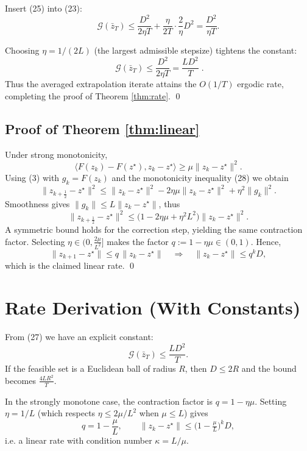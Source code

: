 \documentclass{article}
\begin{document}
Insert (25) into (23):
\[
\mathcal{G}(\bar z_{T})
\le \frac{D^{2}}{2\eta T}+\frac{\eta}{2T}\cdot\frac{2}{\eta}D^{2}
= \frac{D^{2}}{\eta T}. \tag{26}
\]

Choosing $\eta=1/(2L)$ (the largest admissible stepsize) tightens the constant:
\[
\boxed{\;\mathcal{G}(\bar z_{T})\le \frac{D^{2}}{2\eta T}= \frac{L D^{2}}{T}\;}. \tag{27}
\]
Thus the averaged extrapolation iterate attains the $O(1/T)$ ergodic rate, completing the proof of Theorem \ref{thm:rate}. \qed

\subsection*{Proof of Theorem \ref{thm:linear}}
Under strong monotonicity,
\[
\langle F(z_{k})-F(z^{\star}),z_{k}-z^{\star}\rangle\ge \mu\|z_{k}-z^{\star}\|^{2}. \tag{28}
\]
Using (3) with $g_{k}=F(z_{k})$ and the monotonicity inequality (28) we obtain
\[
\|z_{k+\frac12}-z^{\star}\|^{2}
\le \|z_{k}-z^{\star}\|^{2}-2\eta\mu\|z_{k}-z^{\star}\|^{2}+\eta^{2}\|g_{k}\|^{2}. \tag{29}
\]
Smoothness gives $\|g_{k}\|\le L\|z_{k}-z^{\star}\|$, thus
\[
\|z_{k+\frac12}-z^{\star}\|^{2}
\le \bigl(1-2\eta\mu+\eta^{2}L^{2}\bigr)\|z_{k}-z^{\star}\|^{2}. \tag{30}
\]
A symmetric bound holds for the correction step, yielding the same contraction factor. Selecting $\eta\in\bigl(0,\frac{2\mu}{L^{2}}\bigr]$ makes the factor $q:=1-\eta\mu\in(0,1)$. Hence,
\[
\|z_{k+1}-z^{\star}\|\le q\,\|z_{k}-z^{\star}\|\quad\Longrightarrow\quad
\|z_{k}-z^{\star}\|\le q^{k}D,
\]
which is the claimed linear rate. \qed

\section{Rate Derivation (With Constants)}
From (27) we have an explicit constant:
\[
\mathcal{G}(\bar z_{T})\le \frac{L D^{2}}{T}.
\]
If the feasible set is a Euclidean ball of radius $R$, then $D\le 2R$ and the bound becomes $\displaystyle \frac{4LR^{2}}{T}$.

In the strongly monotone case, the contraction factor is $q=1-\eta\mu$. Setting $\eta=1/L$ (which respects $\eta\le 2\mu/L^{2}$ when $\mu\le L$) gives
\[
q=1-\frac{\mu}{L},\qquad
\|z_{k}-z^{\star}\|\le\bigl(1-\tfrac{\mu}{L}\bigr)^{k}D,
\]
i.e. a linear rate with condition number $\kappa=L/\mu$.

\end{document}
